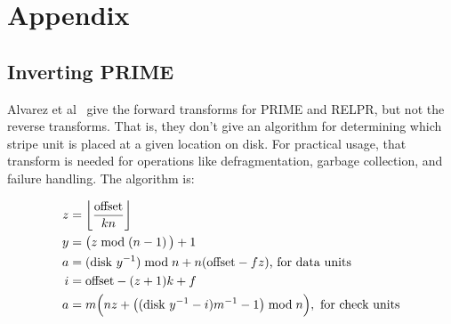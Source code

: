 \documentclass[onecolumn,draft]{IEEEtran}
\DeclarePairedDelimiter\floor{\lfloor}{\rfloor}
\begin{document}
\section{Appendix}

\subsection{Inverting PRIME}

Alvarez et al~\cite{relpr} give the forward transforms for PRIME and RELPR, but
not the reverse transforms.  That is, they don't give an algorithm for
determining which stripe unit is placed at a given location on disk.  For
practical usage, that transform is needed for operations like defragmentation,
garbage collection, and failure handling.  The algorithm is:

\begin{align}
	z &= \floor*{\frac{\text{offset}}{kn}} \\
	y &= \big(z \bmod \left(n - 1\right) \big) + 1 \\
	a &= (\text{disk } y^{-1}) \bmod n + n ( \text{offset} - f z )\text{, for data units} \\
	i &= \text{offset} - (z + 1) k + f \\
	a &= m \Big(n z + \big((\text{disk } y^{-1} - i) m^{-1} - 1\big) \bmod n\Big),\text{ for check units}
\end{align}
\end{document}
